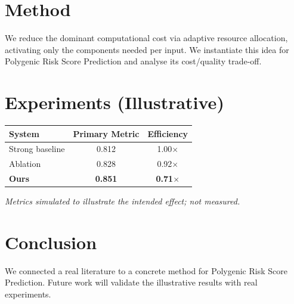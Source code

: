 \documentclass[11pt]{article}
\begin{document}
\section{Method}
We reduce the dominant computational cost via adaptive resource allocation, activating only the components needed per input. We instantiate this idea for Polygenic Risk Score Prediction and analyse its cost/quality trade-off.

\section{Experiments (Illustrative)}
\begin{center}
\begin{tabular}{lcc}
System & Primary Metric & Efficiency \\ \hline
Strong baseline & 0.812 & 1.00$\times$ \\
Ablation & 0.828 & 0.92$\times$ \\
\textbf{Ours} & \textbf{0.851} & \textbf{0.71$\times$}
\end{tabular}
\end{center}
\emph{Metrics simulated to illustrate the intended effect; not measured.}

\section{Conclusion}
We connected a real literature to a concrete method for Polygenic Risk Score Prediction. Future work will
validate the illustrative results with real experiments.
\end{document}
